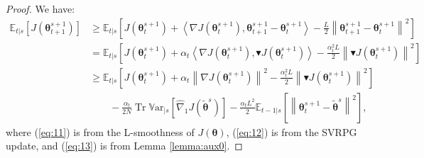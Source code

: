 \documentclass{article}
\theoremstyle{remark}
\theoremstyle{definition}
\DeclareMathOperator{\Tr}{Tr}
\newcommand{\norm}[2][\infty]{\left\|#2\right\|_{#1}}
\newcommand{\dotprod}[2]{\left\langle#1,#2\right\rangle}
\newcommand{\vtheta}{\boldsymbol{\theta}}
\newcommand{\gradJ}[1]{\nabla J(#1)}
\newcommand{\gradApp}[2]{\widehat{\nabla}_{#2}J(#1)}
\newcommand{\Ets}[2][t]{\mathbb{E}_{#1\vert s}\left[#2\right]}
\newcommand{\Varts}[2][t]{{\mathbb{V}\text{ar}}_{#1\vert s}\left[#2\right]}
\newcommand{\gradBlack}[1]{\blacktriangledown J(#1)}
\begin{document}
\begin{proof}
	We have:
	\begin{align}
	\Ets{J(\vtheta_{t+1}^{s+1})} 
	&\geq \Ets{J(\vtheta_t^{s+1})+\dotprod{\gradJ{\vtheta_t^{s+1}}}{\vtheta_{t+1}^{s+1}-\vtheta_t^{s+1}} - \frac{L}{2}\norm[]{\vtheta_{t+1}^{s+1}-\vtheta_t^{s+1}}^2} \label{eq:11}\\
	&= \Ets{J(\vtheta_t^{s+1})+\alpha_t\dotprod{\gradJ{\vtheta_t^{s+1}}}{\gradBlack{\vtheta_t^{s+1}}} - \frac{\alpha_t^2L}{2}\norm[]{\gradBlack{\vtheta_t^{s+1}}}^2} \label{eq:12}\\
	&\geq
	\Ets{J(\vtheta_t^{s+1})+\alpha_t\norm[]{\gradJ{\vtheta_t^{s+1}}}^2 - \frac{\alpha_t^2L}{2}\norm[]{\gradBlack{\vtheta_t^{s+1}}}^2} \nonumber\\
	&\qquad-
	\frac{\alpha_t}{2N}\Tr\Varts[]{\gradApp{\tilde{\vtheta}^s}{1}} -\frac{\alpha_tL^2}{2}\Ets[t-1]{\norm[]{\vtheta_t^{s+1} - \tilde{\vtheta}^s}^2}, \label{eq:13}
\end{align}
where (\ref{eq:11}) is from the L-smoothness of $J(\vtheta)$, (\ref{eq:12}) is from the SVRPG update, and (\ref{eq:13}) is from Lemma \ref{lemma:aux0}.


\end{proof}
\end{document}
